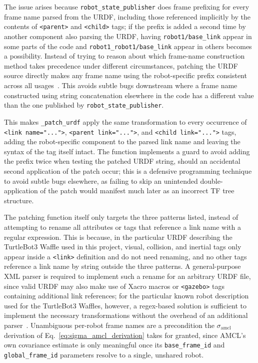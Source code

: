 The issue arises because \texttt{robot\_state\_publisher} does frame prefixing for every frame name parsed from the URDF, including those referenced implicitly by the contents of \texttt{<parent>} and \texttt{<child>} tags; if the prefix is added a second time by another component also parsing the URDF, having \texttt{robot1/base\_link} appear in some parts of the code and \texttt{robot1\_robot1/base\_link} appear in others becomes a possibility. Instead of trying to reason about which frame-name construction method takes precedence under different circumstances, patching the URDF source directly makes any frame name using the robot-specific prefix consistent across all usages~\cite{kaiser2022ros2swarm}. This avoids subtle bugs downstream where a frame name constructed using string concatenation elsewhere in the code has a different value than the one published by \texttt{robot\_state\_publisher}.

This makes \texttt{\_patch\_urdf} apply the same transformation to every occurrence of \texttt{<link name="...">}, \texttt{<parent link="...">}, and \texttt{<child link="...">} tags, adding the robot-specific component to the parsed link name and leaving the syntax of the tag itself intact. The function implements a guard to avoid adding the prefix twice when testing the patched URDF string, should an accidental second application of the patch occur; this is a defensive programming technique to avoid subtle bugs elsewhere, as failing to skip an unintended double-application of the patch would manifest much later as an incorrect TF tree structure.

The patching function itself only targets the three patterns listed, instead of attempting to rename all attributes or tags that reference a link name with a regular expression. This is because, in the particular URDF describing the TurtleBot3 Waffle used in this project, visual, collision, and inertial tags only appear inside a \texttt{<link>} definition and do not need renaming, and no other tags reference a link name by string outside the three patterns. A general-purpose XML parser is required to implement such a rename for an arbitrary URDF file, since valid URDF may also make use of Xacro macros or \texttt{<gazebo>} tags containing additional link references; for the particular known robot description used for the TurtleBot3 Waffles, however, a regex-based solution is sufficient to implement the necessary transformations without the overhead of an additional parser~\cite{kaiser2022ros2swarm}. Unambiguous per-robot frame names are a precondition the $\sigma_{\text{amcl}}$ derivation of Eq.~\eqref{eq:sigma_amcl_derivation} takes for granted, since AMCL's own covariance estimate is only meaningful once its \texttt{base\_frame\_id} and \texttt{global\_frame\_id} parameters resolve to a single, unshared robot.

